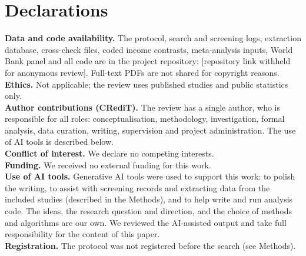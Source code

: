 \documentclass[11pt,a4paper]{article}
\begin{document}
\section*{Declarations}
\small
\noindent\textbf{Data and code availability.} The protocol, search and screening logs, extraction database, cross-check files, coded income contrasts, meta-analysis inputs, World Bank panel and all code are in the project repository: [repository link withheld for anonymous review]. Full-text PDFs are not shared for copyright reasons.\\
\textbf{Ethics.} Not applicable; the review uses published studies and public statistics only.\\
\textbf{Author contributions (CRediT).} The review has a single author, who is responsible for all roles: conceptualisation, methodology, investigation, formal analysis, data curation, writing, supervision and project administration. The use of AI tools is described below.\\
\textbf{Conflict of interest.} We declare no competing interests.\\
\textbf{Funding.} We received no external funding for this work.\\
\textbf{Use of AI tools.} Generative AI tools were used to support this work: to polish the writing, to assist with screening records and extracting data from the included studies (described in the Methods), and to help write and run analysis code. The ideas, the research question and direction, and the choice of methods and algorithms are our own. We reviewed the AI-assisted output and take full responsibility for the content of this paper.\\
\textbf{Registration.} The protocol was not registered before the search (see Methods).
\end{document}
